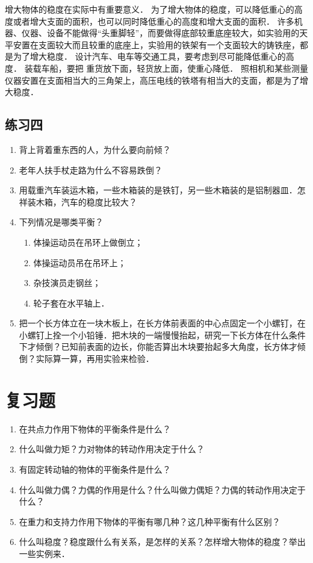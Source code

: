 增大物体的稳度在实际中有重要意义．
为了增大物体的稳度，可以降低重心的高度或者增大支面的面积，也可以同时降低重心的高度和增大支面的面积．
许多机器、仪器、设备不能做得“头重脚轻”，而要做得底部较重底座较大，如实验用的天平安置在支面较大而且较重的底座上，实验用的铁架有一个支面较大的铸铁座，都是为了增大稳度．
设计汽车、电车等交通工具，要考虑到尽可能降低重心的高度．
装载车船，要把
重货放下面，轻货放上面，使重心降低．
照相机和某些测量仪器安置在支面相当大的三角架上，高压电线的铁塔有相当大的支面，都是为了增大稳度．

\subsection*{练习四}
\begin{enumerate}
    \item 背上背着重东西的人，为什么要向前倾？
    \item 老年人扶手杖走路为什么不容易跌倒？
    \item 用载重汽车装运木箱，一些木箱装的是铁钉，另一些木箱装的是铝制器皿．怎祥装木箱，汽车的稳度比较大？
    \item 下列情况是哪类平衡？
    \begin{enumerate}
        \item 体操运动员在吊环上做倒立；
        \item 体操运动员吊在吊环上；
        \item 杂技演员走钢丝；
        \item 轮子套在水平轴上．
    \end{enumerate}
    \item 把一个长方体立在一块木板上，在长方体前表面的中心点固定一个小螺钉，在小螺钉上拴一个小铅锤．把木块的一端慢慢抬起，研究一下长方体在什么条件下才倾倒？已知前表面的边长，你能否算出木块要抬起多大角度，长方体才倾倒？实际算一算，再用实验来检验．
\end{enumerate}

\section*{复习题}

\begin{enumerate}
    \item 在共点力作用下物体的平衡条件是什么？
    \item 什么叫做力矩？力对物体的转动作用决定于什么？
    \item 有固定转动轴的物体的平衡条件是什么？
    \item 什么叫做力偶？力偶的作用是什么？什么叫做力偶矩？力偶的转动作用决定于什么？
    \item 在重力和支持力作用下物体的平衡有哪几种？这几种平衡有什么区别？
    \item 什么叫稳度？稳度跟什么有关系，是怎样的关系？怎样增大物体的稳度？举出一些实例来．
\end{enumerate}

